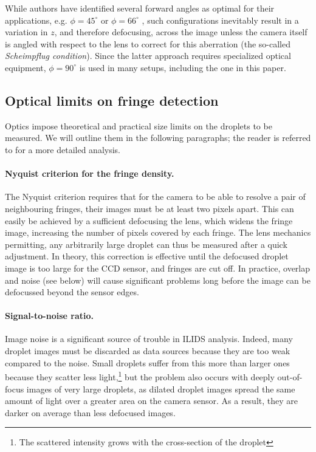 \documentclass[11.5pt]{book}
\begin{document}
While authors have identified several forward angles as optimal for their
applications, e.g. $\phi = 45^\circ$ \cite{Glover95} or $\phi = 66^\circ$
\cite{Mounaim99}, such configurations inevitably result in a variation in $z$,
and therefore defocusing, across the image unless the
camera itself is angled with respect to the lens to correct for this aberration
(the so-called \emph{Scheimpflug condition}). Since the latter approach requires
specialized optical equipment, $\phi = 90^\circ$ is used in many setups,
including the one in this paper.

\subsection{Optical limits on fringe detection}
\label{sec:ipi-fringelimits}
Optics impose theoretical and practical size limits on the droplets to be
measured. We will outline them in the following paragraphs; the reader is
referred to \citet{Damaschke02} for a more detailed analysis.

\paragraph{Nyquist criterion for the fringe density.}
The Nyquist criterion requires that for the camera to be able to resolve a pair
of neighbouring fringes, their images must be at least two pixels apart. This
can easily be achieved by a sufficient defocusing the lens, which widens the
fringe image, increasing the number of pixels covered by each fringe. The lens
mechanics permitting, any arbitrarily large droplet can thus be measured after a
quick adjustment. In theory, this correction is effective until the defocused
droplet image is too large for the CCD sensor, and fringes are cut off. In
practice, overlap and noise (see below) will cause significant problems long
before the image can be defocussed beyond the sensor edges.

\paragraph{Signal-to-noise ratio.}
Image noise is a significant source of trouble in ILIDS analysis. Indeed, many
droplet images must be discarded as data sources because they are too weak
compared to the noise.
Small droplets suffer from this more than larger ones because they scatter less
light,\footnote{The scattered intensity grows with the cross-section of the
droplet} but the problem also occurs with deeply out-of-focus images of very large
droplets, as dilated droplet images spread the same amount of light over a
greater area on the camera sensor. As a result, they are darker on average than
less defocused images. 
\end{document}
